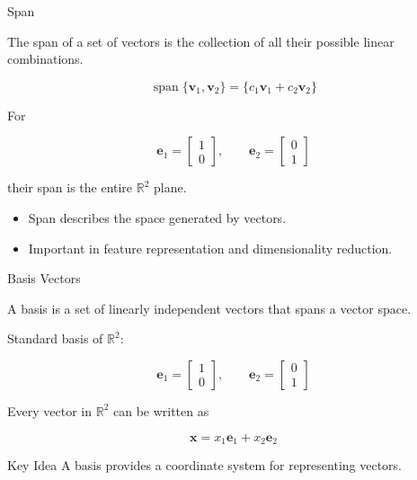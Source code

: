 \documentclass[aspectratio=169]{beamer}
\begin{document}
\begin{frame}{Span}
\small

The span of a set of vectors is the collection of all their possible
linear combinations.

$$
\operatorname{span}\{\mathbf{v}_1,\mathbf{v}_2\}
=
\{c_1\mathbf{v}_1+c_2\mathbf{v}_2\}
$$

For

$$
\mathbf{e}_1=
\begin{bmatrix}
1\\
0
\end{bmatrix},
\qquad
\mathbf{e}_2=
\begin{bmatrix}
0\\
1
\end{bmatrix}
$$

their span is the entire $\mathbb{R}^2$ plane.

\begin{itemize}
\item Span describes the space generated by vectors.
\item Important in feature representation and dimensionality reduction.
\end{itemize}

\end{frame}

\begin{frame}{Basis Vectors}
\small

A basis is a set of linearly independent vectors that spans a vector space.

Standard basis of $\mathbb{R}^2$:

$$
\mathbf{e}_1=
\begin{bmatrix}
1\\
0
\end{bmatrix},
\qquad
\mathbf{e}_2=
\begin{bmatrix}
0\\
1
\end{bmatrix}
$$

Every vector in $\mathbb{R}^2$ can be written as

$$
\mathbf{x}=x_1\mathbf{e}_1+x_2\mathbf{e}_2
$$

\begin{block}{Key Idea}
A basis provides a coordinate system for representing vectors.
\end{block}

\end{frame}
\end{document}
